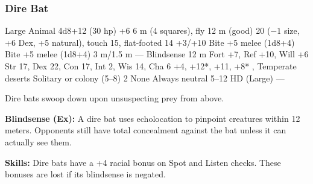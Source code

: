 \subsubsection{Dire Bat}
\begin{MonsterStats}
{Large Animal}
{4d8+12 (30 hp)}
{+6}
{6 m (4 squares), fly 12 m (good)}
{20 ($-1$ size, +6 Dex, +5 natural), touch 15, flat-footed 14}
{+3/+10}
{Bite +5 melee (1d8+4)}
{Bite +5 melee (1d8+4)}
{3 m/1.5 m}
{---}
{Blindsense 12 m}
{Fort +7, Ref +10, Will +6}
{Str 17, Dex 22, Con 17, Int 2, Wis 14, Cha 6}
{ +4,  +12*,  +11,  +8*}
{, }
{Temperate deserts}
{Solitary or colony (5--8)}
{2}
{None}
{Always neutral}
{5--12 HD (Large)}
{---}
\end{MonsterStats}


Dire bats swoop down upon unsuspecting prey from above.

\textbf{Blindsense (Ex):} A dire bat uses echolocation to pinpoint creatures within 12 meters. Opponents still have total concealment against the bat unless it can actually see them.

\textbf{Skills:} Dire bats have a +4 racial bonus on Spot and Listen checks. These bonuses are lost if its blindsense is negated.

